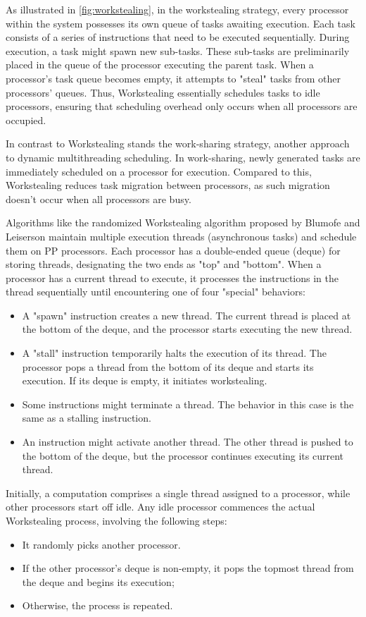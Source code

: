 \documentclass{mproj}
\begin{document}
As illustrated in \cref{fig:workstealing},
in the workstealing strategy, every processor within the system possesses its own queue of tasks awaiting execution.
Each task consists of a series of instructions that need to be executed sequentially.
During execution, a task might spawn new sub-tasks.
These sub-tasks are preliminarily placed in the queue of the processor executing the parent task.
When a processor's task queue becomes empty, it attempts to "steal" tasks from other processors' queues.
Thus, Workstealing essentially schedules tasks to idle processors,
ensuring that scheduling overhead only occurs when all processors are occupied\cite{10.1145/1248377.1248396}.

In contrast to Workstealing stands the work-sharing strategy,
another approach to dynamic multithreading scheduling.
In work-sharing, newly generated tasks are immediately scheduled on a processor for execution.
Compared to this, Workstealing reduces task migration between processors,
as such migration doesn't occur when all processors are busy\cite{10.1145/324133.324234}.

Algorithms like the randomized Workstealing algorithm proposed by Blumofe and Leiserson maintain multiple execution threads (asynchronous tasks) and schedule them on PP processors\cite{10.1145/324133.324234}.
Each processor has a double-ended queue (deque) for storing threads,
designating the two ends as "top" and "bottom".
When a processor has a current thread to execute,
it processes the instructions in the thread sequentially until encountering one of four "special" behaviors:
\begin{itemize}
    \item A "spawn" instruction creates a new thread. The current thread is placed at the bottom of the deque, and the processor starts executing the new thread.
    \item A "stall" instruction temporarily halts the execution of its thread. The processor pops a thread from the bottom of its deque and starts its execution. If its deque is empty, it initiates workstealing.
    \item Some instructions might terminate a thread. The behavior in this case is the same as a stalling instruction.
    \item An instruction might activate another thread. The other thread is pushed to the bottom of the deque, but the processor continues executing its current thread.
\end{itemize}
Initially, a computation comprises a single thread assigned to a processor, while other processors start off idle.
Any idle processor commences the actual Workstealing process, involving the following steps:
\begin{itemize}
    \item It randomly picks another processor.
    \item If the other processor's deque is non-empty, it pops the topmost thread from the deque and begins its execution;
    \item Otherwise, the process is repeated.
\end{itemize}
\end{document}
